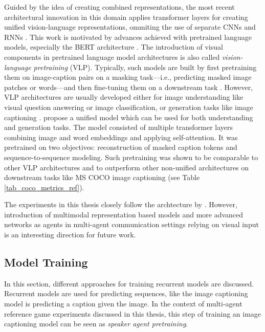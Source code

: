 Guided by the idea of creating combined representations, the most recent architectural innovation in this domain applies transformer layers for creating unified vision-language representations, ommiting the use of separate CNNs and RNNs \parencite{vaswani2017attention, zhou2019unified}. This work is motivated by advances achieved with pretrained language models, especially the BERT architecture \parencite{devlin2018bert}. The introduction of visual components in pretrained language model architectures is also called \textit{vision-language pretraining} (VLP). Typically, such models are built by first pretraining them on image-caption pairs on a masking task---i.e., predicting masked image patches or words---and then fine-tuning them on a downstream task \parencite[e.g.,][]{lu2019vilbert}.
However, VLP architectures are usually developed either for image understanding like visual question answering or image classification, or generation tasks like image captioning \parencite{zhou2019unified}. 
\cite{zhou2019unified} propose a unified model which can be used for both understanding and generation tasks. 
The model consisted of multiple transformer layers combining image and word embeddings and applying self-attention. It was pretrained on two objectives: reconstruction of masked caption tokens and sequence-to-sequence modeling. Such pretraining was shown to be comparable to other VLP architectures and to outperform other non-unified architectures on downstream tasks like MS COCO image captioning (see Table \ref{tab_coco_metrics_ref}). 

The experiments in this thesis closely follow the archtecture by \cite{vinyals2015show}. However, introduction of multimodal representation based models and more advanced networks as agents in multi-agent communication settings relying on visual input is an interesting direction for future work. 

\subsection{Model Training}
\label{model_pretraining}
In this section, different approaches for training recurrent models are discussed. Recurrent models are used for predicting sequences, like the image captioning model is predicting a caption given the image. In the context of multi-agent reference game experiments discussed in this thesis, this step of training an image captioning model can be seen as \emph{speaker agent pretraining}.

